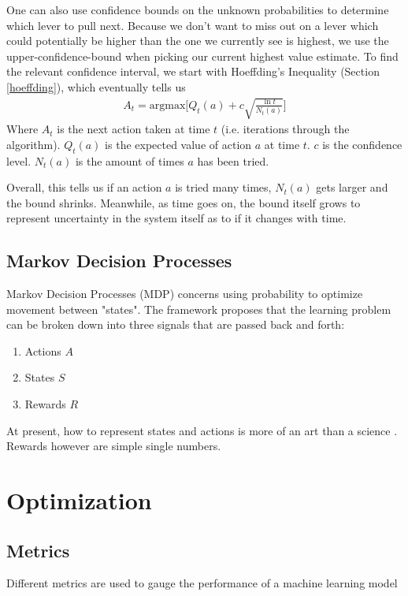 One can also use confidence bounds on the unknown probabilities to determine which lever to pull next. Because we don't want to miss out on a lever which could potentially be higher than the one we currently see is highest, we use the upper-confidence-bound when picking our current highest value estimate. To find the relevant confidence interval, we start with Hoeffding's Inequality (Section \ref{hoeffding}), which eventually tells us
\begin{align}
	A_t = \textrm{argmax}\Big[Q_t(a) + c\sqrt{\frac{\ln t}{N_t(a)}}\Big]
\end{align}
Where $A_t$ is the next action taken at time $t$ (i.e. iterations through the algorithm). $Q_t(a)$ is the expected value of action $a$ at time $t$. $c$ is the confidence level. $N_t(a)$ is the amount of times $a$ has been tried.

Overall, this tells us if an action $a$ is tried many times, $N_t(a)$ gets larger and the bound shrinks. Meanwhile, as time goes on, the bound itself grows to represent uncertainty in the system itself as to if it changes with time.


\subsection{Markov Decision Processes}
Markov Decision Processes (MDP) concerns using probability to optimize movement between "states". The framework proposes that the learning problem can be broken down into three signals that are passed back and forth: 
\begin{enumerate}
	\item Actions $A$
	\item States $S$
	\item Rewards $R$
\end{enumerate}
At present, how to represent states and actions is more of an art than a science \cite{sutton}. Rewards however are simple single numbers.



\section{Optimization}

\subsection{Metrics}
Different metrics are used to gauge the performance of a machine learning model

